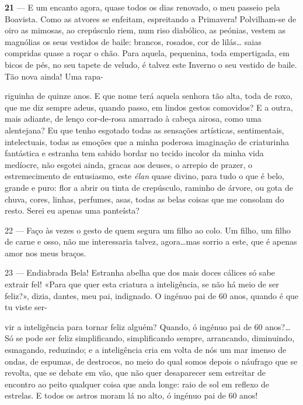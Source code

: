 \textbf{21} — E um encanto agora, quase todos os dias
renovado, o meu passeio pela Boavista. Como as
atvores se enfeitam, espreitando a Primavera! 
Polvilham-se de oiro as mimosas, ao crepúsculo riem, num
riso diabólico, as peónias, vestem as magnólias os
seus vestidos de baile: brancos, rosados, cor de lilás\ldots
saias compridas quase a roçar o chão. Para aquela,
pequenina, toda empertigada, em bicos de pés, no
seu tapete de veludo, é talvez este Inverno o seu
vestido de baile. Tão nova ainda! Uma rapa-


\pagebreak


riguinha de quinze anos. E que nome terá aquela 
senhora tão alta, toda de roxo, que me diz sempre adeus,
quando passo, em lindos gestos comovidos? E a outra,
mais adiante, de lenço cor-de-rosa amarrado à cabeça
airosa, como uma alentejana? Eu que tenho esgotado
todas as sensações artísticas, sentimentais, intelectuais,
todas as emoções que a minha poderosa imaginação
de criaturinha fantástica e estranha tem sabido bordar
no tecido incolor da minha vida medíocre, não esgotei
ainda, gracas aos deuses, o arrepio de prazer, o 
estremecimento de entusiasmo, este \textit{élan} quase divino,
para tudo o que é belo, grande e puro: flor a abrir ou
tinta de crepúsculo, raminho de árvore, ou gota de
chuva, cores, linhas, perfumes, asas, todas as belas
coisas que me consolam do resto. Serei eu apenas uma
panteísta?

22 — Faço às vezes o gesto de quem segura um filho
ao colo. Um filho, um filho de carne e osso, não me
interessaria talvez, agora\ldots mas sorrio a este, que é
apenas amor nos meus braços.

23 — Endiabrada Bela! Estranha abelha que dos mais
doces cálices só sabe extrair fel! «Para que quer
esta criatura a inteligência, se não há meio de ser
feliz?», dizia, dantes, meu pai, indignado. O 
ingénuo pai de 60 anos, quando é que tu viste ser-


\pagebreak


vir a inteligência para tornar feliz alguém? Quando,
ó ingénuo pai de 60 anos?\ldots Só se pode ser feliz
simplificando, simplificando sempre, arrancando, 
diminuindo, esmagando, reduzindo; e a inteligência cria
em volta de nós um mar imenso de ondas, de espumas,
de destrocos, no meio do qual somos depois o 
náufrago que se revolta, que se debate em vão, que não
quer desaparecer sem estreitar de encontro ao peito
qualquer coisa que anda longe: raio de sol em reflexo
de estrelas. E todos os astros moram lá no alto, ó
ingénuo pai de 60 anos!

